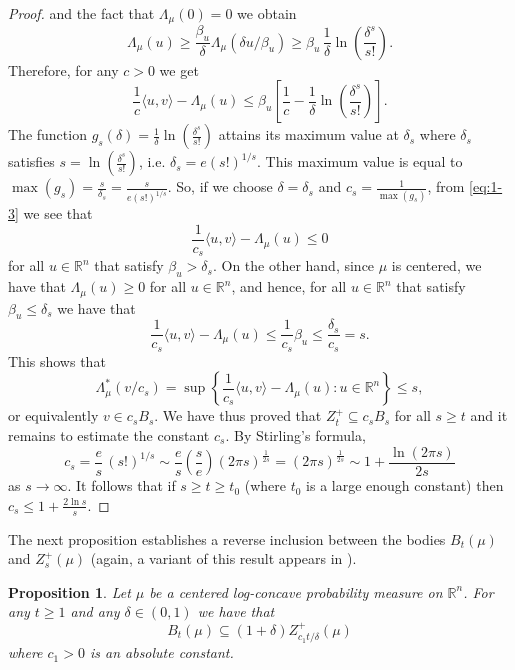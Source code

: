 \documentclass[11pt,leqno]{article}
\newtheorem{proposition}[theorem]{Proposition}
\theoremstyle{definition}
\theoremstyle{remark}
\numberwithin{equation}{section}
\newcommand{\ls}{\leqslant}
\newcommand{\gr}{\geqslant}
\newcommand{\1}{\textbf{1}}
\begin{document}
\begin{proof}
and the fact that $\Lambda_{\mu}(0)=0$ we obtain
\begin{equation*}\Lambda_{\mu}(u) \gr \frac{\beta_u}{\delta}\Lambda_{\mu}(\delta u/\beta_u)
\gr \beta_u\,\frac{1}{\delta}\ln\left(\frac{\delta^s}{s!}\right).\end{equation*} Therefore, for any $c>0$ we get
\begin{equation}\label{eq:1-3}\frac{1}{c}\langle u,v\rangle-\Lambda_{\mu}(u) \ls
\beta_u \left[\frac{1}{c}-\frac{1}{\delta}\ln\left(\frac{\delta^s}{s!}\right)\right].\end{equation}
The function $g_s(\delta)=\frac{1}{\delta}\ln\left(\frac{\delta^s}{s!}\right)$ attains its maximum value
at $\delta_s$ where $\delta_s$ satisfies $s=\ln\left(\frac{\delta^s}{s!}\right)$, i.e. $\delta_s=e(s!)^{1/s}$.
This maximum value is equal to $\max(g_s)=\frac{s}{\delta_s}=\frac{s}{e(s!)^{1/s}}$. So, if we choose $\delta=\delta_s$
and $c_s=\frac{1}{\max(g_s)}$, from \eqref{eq:1-3} we see that
\begin{equation}\label{eq:1-4}\frac{1}{c_s}\langle u,v\rangle-\Lambda_{\mu}(u)\ls 0\end{equation}
for all $u\in\mathbb{R}^n$ that satisfy $\beta_u>\delta_s$. On the other hand, since $\mu$ is centered, we have that
$\Lambda_{\mu}(u)\gr 0$ for all $u\in\mathbb{R}^n$, and hence, for all $u\in\mathbb{R}^n$ that satisfy $\beta_u\ls\delta_s$ we have that
\begin{equation}\label{eq:1-5}\frac{1}{c_s}\langle u,v\rangle -\Lambda_\mu(u) \ls \frac{1}{c_s}\beta_u\ls \frac{\delta_s}{c_s}=s.\end{equation}
This shows that
$$\Lambda_{\mu}^{\ast}(v/c_s)=\sup\left\{\frac{1}{c_s}\langle u,v\rangle -\Lambda_{\mu}(u):u\in\mathbb{R}^n\right\}
\ls s,$$
or equivalently $v\in c_sB_s$. We have thus proved that $Z_t^+\subseteq c_sB_s$ for all $s\gr t$ and it remains to
estimate the constant $c_s$. By Stirling's formula,
$$c_s=\frac{e}{s}\,(s!)^{1/s}\sim \frac{e}{s}\left(\frac{s}{e}\right)(2\pi s)^{\frac{1}{2s}}=(2\pi s)^{\frac{1}{2s}}\sim
1+\frac{\ln(2\pi s)}{2s}$$
as $s\to\infty$. It follows that if $s\gr t\gr t_0$ (where $t_0$ is a large enough constant) then $c_s\ls 1+\frac{2\ln s}{s}$.
\end{proof}


The next proposition establishes a reverse inclusion between the bodies $B_t(\mu )$ and $Z_s^+(\mu )$
(again, a variant of this result appears in \cite[Proposition~3.5]{Latala-Wojtaszczyk-2008}).

\begin{proposition}\label{prop:B<Z}Let $\mu $ be a centered log-concave probability measure on $\mathbb{R}^n$.
For any $t\gr 1$ and any $\delta\in (0,1)$ we have that
\begin{equation*}B_t(\mu) \subseteq (1+\delta)Z_{c_1t/\delta}^+(\mu)\end{equation*}
where $c_1>0$ is an absolute constant.
\end{proposition}
\end{document}
